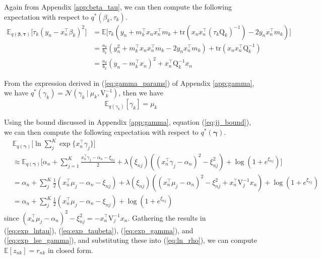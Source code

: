 \documentclass[twoside,11pt]{article}
\newcommand{\tr}{\intercal}
\newcommand\given[1][]{\:#1\vert\:}
\newcommand{\E}{\mathbb{E}}
\begin{document}
Again from Appendix \ref{app:beta_tau}, we can then compute the following expectation with respect to $q^{*}(\beta_k, \tau_k)$.
\begin{equation} \label{eq:exp_taubeta}
\begin{split}
	\E_{q(\boldsymbol\beta, \boldsymbol\tau)}\big[\tau_k (y_n - x_n^{\tr}\beta_k)^2\big] &= 
	\E \bigg[\tau_k \left( y_n + m_k^{\tr} x_n x_n^{\tr} m_k + \mathrm{tr} \left(x_n x_n^{\tr}\left(\tau_k \mathrm{Q}_k \right)^{-1} \right) - 2y_n x_n^{\tr} m_k \right) \bigg] \\
	&=  \frac{a_k}{b_k} \left(y_n^2 + m_k^{\tr}x_nx_n^{\tr} m_k -  2y_n x_n^{\tr} m_k\right) + \mathrm{tr} \left( x_n x_n^{\tr} \mathrm{Q}_k^{-1}\right) \\
	&= \frac{a_k}{b_k}(y_n - m_k^{\tr}x_n)^2 + x_n^{\tr} \mathrm{Q}_k^{-1} x_n
\end{split}
\end{equation}


From the expression derived in (\ref{eq:gamma_params}) of Appendix \ref{app:gamma}, we have $q^{*}(\gamma_k) = \mathcal{N}(\gamma_k \given \mu_k, \mathrm{V}_k^{-1})$, then we have
\begin{equation} \label{eq:exp_gamma}
	\E_{q(\gamma_k)}[\gamma_k] = \mu_k
\end{equation}

Using the bound discussed in Appendix \ref{app:gamma}, equation (\ref{eq:jj_bound}), we can then compute the following expectation with respect to $q^{*}(\boldsymbol\gamma)$.
\begin{equation} \label{eq:exp_lse_gamma}
\begin{split}
	& \E_{q(\boldsymbol\gamma)} \Bigg[ \ln \sum_{j}^K \exp \{ x_n^{\tr} \gamma_j \} \Bigg] \\
	& \approx \E_{q(\boldsymbol\gamma)} \Bigg[ \alpha_n + \sum_{j = 1}^K \frac{x_n^{\intercal} \gamma_j - \alpha_n - \xi_{nj}}{2} + \lambda(\xi_{nj}) \left( (x_n^{\intercal} \gamma_j - \alpha_n)^2 - \xi_{nj}^2\right) + \log \left( 1 + e^{\xi_{nj}}\right) \Bigg] \\
	& = \alpha_n + \sum_{j}^K \frac{1}{2}\left(x_n^{\tr}\mu_j - \alpha_n - \xi_{nj}\right) + \lambda(\xi_{nj}) \left( (x_n^{\tr} \mu_j - \alpha_n)^2 - \xi_{nj}^2 + x_n^{\tr} \mathrm{V}_j^{-1} x_n \right) + \log( 1 + e^{\xi_{nj}}) \\
	&= \alpha_n + \sum_{j}^K \frac{1}{2}\left(x_n^{\tr}\mu_j - \alpha_n - \xi_{nj}\right) + \log( 1 + e^{\xi_{nj}})
\end{split}
\end{equation}
since $(x_n^{\tr} \mu_j - \alpha_n)^2 - \xi_{nj}^2 = - x_n^{\tr} \mathrm{V}_j^{-1} x_n$. Gathering the results in (\ref{eq:exp_lntau}), (\ref{eq:exp_taubeta}), (\ref{eq:exp_gamma}), and (\ref{eq:exp_lse_gamma}), and substituting these into (\ref{eq:ln_rho}), we can compute $\E[z_{nk}] = r_{nk}$ in closed form. 
\end{document}
